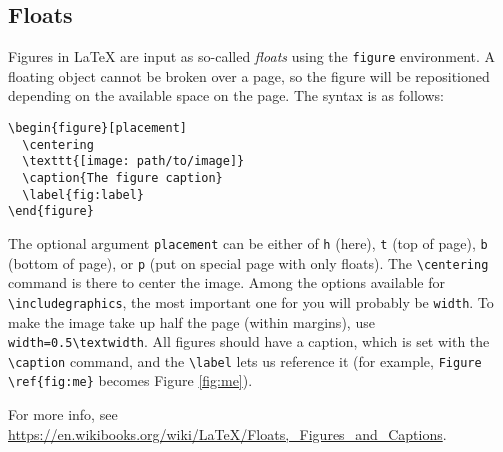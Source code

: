 \subsection{Floats}
\label{sec:floats}

Figures in \LaTeX{} are input as so-called \emph{floats} using the \texttt{figure} environment.
A floating object cannot be broken over a page, so the figure will be repositioned depending on the available space on the page.
The syntax is as follows:
%
\begin{verbatim}
\begin{figure}[placement]
  \centering
  \texttt{[image: path/to/image]}
  \caption{The figure caption}
  \label{fig:label}
\end{figure}
\end{verbatim}
%
The optional argument \texttt{placement} can be either of \texttt{h} (here), \texttt{t} (top of page), \texttt{b} (bottom of page), or \texttt{p} (put on special page with only floats).
The \verb!\centering! command is there to center the image.
Among the options available for \verb!\includegraphics!, the most important one for you will probably be \texttt{width}.
To make the image take up half the page (within margins), use \verb!width=0.5\textwidth!.
All figures should have a caption, which is set with the \verb!\caption! command, and the \verb!\label! lets us reference it (for example, \verb!Figure \ref{fig:me}! becomes Figure \ref{fig:me}).



For more info, see \url{https://en.wikibooks.org/wiki/LaTeX/Floats,_Figures_and_Captions}.
